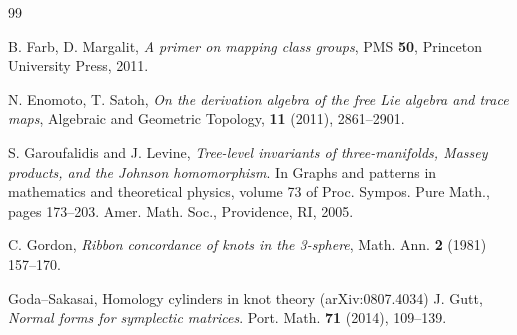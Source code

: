 \documentclass{article}
\theoremstyle{plain}
\theoremstyle{definition}
\begin{document}
{\begin{thebibliography}{99}



%



B. Farb, D. Margalit, {\it A primer on mapping class groups}, PMS {\bf 50}, Princeton
University Press, 2011.

N. Enomoto, T. Satoh, {\it On the derivation algebra of the free Lie algebra and trace maps}, Algebraic and Geometric Topology, {\bf 11} (2011), 2861--2901.


 S. Garoufalidis and J. Levine, {\it Tree-level invariants of three-manifolds, Massey products, and the Johnson homomorphism}. In Graphs and patterns in mathematics and theoretical physics, volume 73 of Proc. Sympos. Pure Math., pages 173--203. Amer. Math. Soc., Providence, RI, 2005.

 C. Gordon, {\it Ribbon concordance of knots in the 3-sphere}, Math. Ann. {\bf 2} (1981) 157--170.




 Goda–Sakasai, Homology cylinders in knot theory (arXiv:0807.4034)
J. Gutt, {\it Normal forms for symplectic matrices}. Port. Math. {\bf 71} (2014), 109--139.


\end{thebibliography}}
\end{document}
